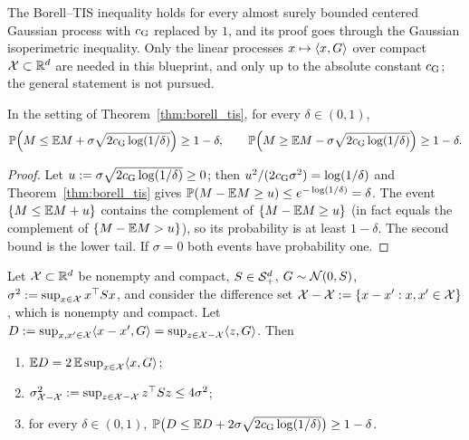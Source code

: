\begin{remark}\label{rem:pc_borell_tis_classical}
The Borell--TIS inequality \cite[Theorem~2.1.1]{adler2007random} holds for every
almost surely bounded centered Gaussian process with $c_{\mathrm{G}}$ replaced by $1$, and its proof
goes through the Gaussian isoperimetric inequality. Only the linear processes
$x\mapsto\langle x, G \rangle$ over compact $\mathcal{X} \subset \mathbb{R}^d$ are needed in this blueprint, and only up
to the absolute constant $c_{\mathrm{G}}$; the general statement is not pursued.
\end{remark}

\begin{corollary}\label{cor:sup_bound_whp}
In the setting of Theorem~\ref{thm:borell_tis}, for every $\delta \in (0,1)$,
\[
  \mathbb{P}\Big(M \le \mathbb{E} M + \sigma\sqrt{2c_{\mathrm{G}}\log(1/\delta)}\Big) \ge 1 - \delta, \qquad
  \mathbb{P}\Big(M \ge \mathbb{E} M - \sigma\sqrt{2c_{\mathrm{G}}\log(1/\delta)}\Big) \ge 1 - \delta .
\]
\end{corollary}

\begin{proof}
Let $u := \sigma\sqrt{2c_{\mathrm{G}}\log(1/\delta)} \ge 0$; then $u^2/(2c_{\mathrm{G}}\sigma^2) = \log(1/\delta)$
and Theorem~\ref{thm:borell_tis} gives $\mathbb{P}(M - \mathbb{E} M \ge u) \le e^{-\log(1/\delta)} = \delta$.
The event $\{M \le \mathbb{E} M + u\}$ contains the complement of $\{M - \mathbb{E} M \ge u\}$ (in fact
equals the complement of $\{M - \mathbb{E} M > u\}$), so its probability is at least $1 - \delta$. The
second bound is the lower tail. If $\sigma = 0$ both events have probability one.
\end{proof}

\begin{corollary}\label{cor:sup_bound_symmetric}
\leanok
{}
Let $\mathcal{X} \subset \mathbb{R}^d$ be nonempty and compact, $S \in \mathcal{S}_{+}^{d}$, $G \sim \mathcal{N}(0,S)$,
$\sigma^2 := \sup_{x\in\mathcal{X}}x^\top Sx$, and consider the difference set
$\mathcal{X} - \mathcal{X} := \{x - x' : x, x' \in \mathcal{X}\}$, which is nonempty and compact. Let
$D := \sup_{x,x'\in\mathcal{X}}\langle x - x', G \rangle = \sup_{z\in\mathcal{X}-\mathcal{X}}\langle z, G \rangle$. Then
\begin{enumerate}
  \item[(i)] $\mathbb{E} D = 2\,\mathbb{E}\sup_{x\in\mathcal{X}}\langle x, G \rangle$;
  \item[(ii)] $\sigma^2_{\mathcal{X}-\mathcal{X}} := \sup_{z\in\mathcal{X}-\mathcal{X}}z^\top Sz \le 4\sigma^2$;
  \item[(iii)] for every $\delta\in(0,1)$,
        $\mathbb{P}\big(D \le \mathbb{E} D + 2\sigma\sqrt{2c_{\mathrm{G}}\log(1/\delta)}\big) \ge 1 - \delta$.
\end{enumerate}
\end{corollary}

